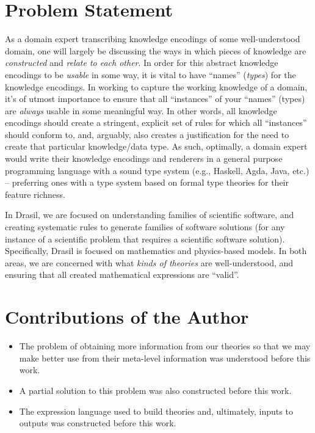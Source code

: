 

\section{Problem Statement}


As a domain expert transcribing knowledge encodings of some well-understood
domain, one will largely be discussing the ways in which pieces of knowledge are
\textit{constructed} and \textit{relate to each other}. In order for this
abstract knowledge encodings to be \textit{usable} in some way, it is vital to
have ``names'' (\textit{types}) for the knowledge encodings. In working to
capture the working knowledge of a domain, it's of utmost importance to ensure
that all ``instances'' of your ``names'' (types) are \textit{always} usable in
some meaningful way. In other words, all knowledge encodings should create a
stringent, explicit set of rules for which all ``instances'' should conform to,
and, arguably, also creates a justification for the need to create that
particular knowledge/data type. As such, optimally, a domain expert would write
their knowledge encodings and renderers in a general purpose programming
language with a sound type system (e.g., Haskell, Agda, Java, etc.) --
preferring ones with a type system based on formal type theories for their
feature richness.

In Drasil, we are focused on understanding families of scientific software, and
creating systematic rules to generate families of software solutions (for any
instance of a scientific problem that requires a scientific software solution).
Specifically, Drasil is focused on mathematics and physics-based models. In both
areas, we are concerned with what \textit{kinds of theories} are
well-understood, and ensuring that all created mathematical expressions are
``valid''. 

\section{Contributions of the Author}

\begin{itemize}
    \item The problem of obtaining more information from our theories so that we
          may make better use from their meta-level information was understood
          before this work.
    \item A partial solution to this problem was also constructed before this
          work.
    \item The expression language used to build theories and, ultimately, inputs
          to outputs was constructed before this work.
\end{itemize}

